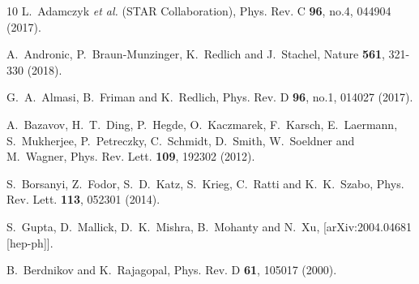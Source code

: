\documentclass[10pt,aps,prc,twocolumn,floatfix]{revtex4-1}
\begin{document}
\begin{thebibliography}{10}
L.~Adamczyk \textit{et al.} (STAR Collaboration),
Phys. Rev. C \textbf{96}, no.4, 044904 (2017).

A.~Andronic, P.~Braun-Munzinger, K.~Redlich and J.~Stachel,
Nature \textbf{561}, 321-330 (2018).

G.~A.~Almasi, B.~Friman and K.~Redlich,
Phys. Rev. D \textbf{96}, no.1, 014027 (2017).

A.~Bazavov, H.~T.~Ding, P.~Hegde, O.~Kaczmarek, F.~Karsch, E.~Laermann, S.~Mukherjee, P.~Petreczky, C.~Schmidt, D.~Smith, W.~Soeldner and M.~Wagner,
Phys. Rev. Lett. \textbf{109}, 192302 (2012).

S.~Borsanyi, Z.~Fodor, S.~D.~Katz, S.~Krieg, C.~Ratti and K.~K.~Szabo,
Phys. Rev. Lett. \textbf{113}, 052301 (2014).

S.~Gupta, D.~Mallick, D.~K.~Mishra, B.~Mohanty and N.~Xu,
[arXiv:2004.04681 [hep-ph]].

B.~Berdnikov and K.~Rajagopal,
Phys. Rev. D \textbf{61}, 105017 (2000).


\end{thebibliography}
\end{document}
